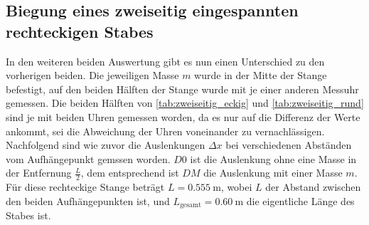 \subsection{Biegung eines zweiseitig eingespannten rechteckigen Stabes}
\label{sec:Biegung eines zweiseitig eingespannten rechteckigen Stabes}

In den weiteren beiden Auswertung gibt es nun einen Unterschied zu den vorherigen beiden. Die jeweiligen Masse $m$ wurde in der Mitte der Stange befestigt, auf den beiden Hälften der Stange wurde mit je einer anderen Messuhr gemessen. Die beiden Hälften von \autoref{tab:zweiseitig_eckig} und \autoref{tab:zweiseitig_rund} sind je mit beiden Uhren gemessen worden, da es nur auf die Differenz der Werte ankommt, sei die Abweichung der Uhren voneinander zu vernachlässigen. Nachfolgend sind wie zuvor die Auslenkungen $\Delta x$ bei verschiedenen Abständen vom Aufhängepunkt gemssen worden. $D0$ ist die Auslenkung ohne eine Masse in der Entfernung $\frac{L}{2}$, dem entsprechend ist $DM$ die Auslenkung mit einer Masse $m$. Für diese rechteckige Stange beträgt $L = \SI{0.555}{\meter}$, wobei $L$ der Abstand zwischen den beiden Aufhängepunkten ist, und $L_\text{gesamt} = \SI{0.60}{\meter}$ die eigentliche Länge des Stabes ist.

